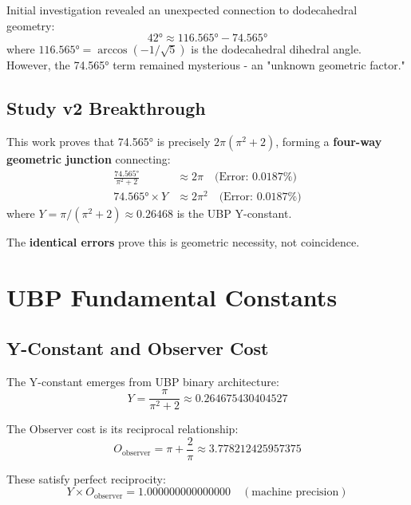 \documentclass[11pt,a4paper]{article}
\begin{document}
Initial investigation\cite{rainbow_v1} revealed an unexpected connection to dodecahedral geometry:
\begin{equation}
42° \approx 116.565° - 74.565°
\end{equation}
where $116.565° = \arccos(-1/\sqrt{5})$ is the dodecahedral dihedral angle. However, the 74.565° term remained mysterious - an "unknown geometric factor."

\subsection{Study v2 Breakthrough}

This work proves that 74.565° is precisely $2\pi(\pi^2+2)$, forming a \textbf{four-way geometric junction} connecting:
\begin{align}
\frac{74.565°}{\pi^2+2} &\approx 2\pi \quad \text{(Error: 0.0187\%)}\\
74.565° \times Y &\approx 2\pi^2 \quad \text{(Error: 0.0187\%)}
\end{align}
where $Y = \pi/(\pi^2+2) \approx 0.26468$ is the UBP Y-constant.

The \textbf{identical errors} prove this is geometric necessity, not coincidence.

\section{UBP Fundamental Constants}

\subsection{Y-Constant and Observer Cost}

The Y-constant emerges from UBP binary architecture\cite{ubp_y_constant}:
\begin{equation}
Y = \frac{\pi}{\pi^2 + 2} \approx 0.264675430404527
\end{equation}

The Observer cost is its reciprocal relationship:
\begin{equation}
O_{\text{observer}} = \pi + \frac{2}{\pi} \approx 3.778212425957375
\end{equation}

These satisfy perfect reciprocity:
\begin{equation}
Y \times O_{\text{observer}} = 1.000000000000000 \quad (\text{machine precision})
\end{equation}
\end{document}
